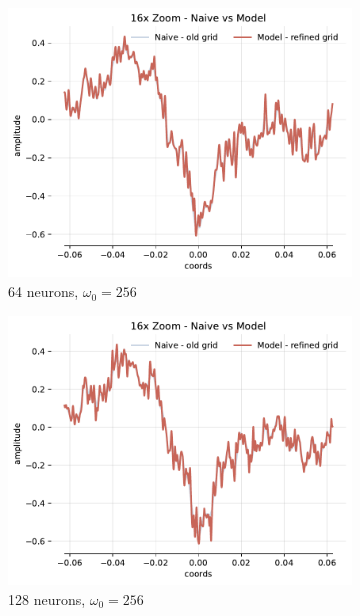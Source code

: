 \begin{figure}[h]
    \begin{subfigure}[b]{0.32\textwidth}
        \centering
        \includegraphics[width=\textwidth]{img/ch3/16x-zoom-1hl-64hf-256hz.pdf}
        \caption{64 neurons, $\omega_0=256$}
        \label{fig:16x-zoom-1hl-64hf-256hz}
    \end{subfigure}
    \begin{subfigure}[b]{0.32\textwidth}
        \centering
        \includegraphics[width=\textwidth]{img/ch3/16x-zoom-1hl-128hf-256hz.pdf}
        \caption{128 neurons, $\omega_0=256$}
        \label{fig:16x-zoom-1hl-128hf-256hz}
    \end{subfigure}
    \begin{subfigure}[b]{0.32\textwidth}

\end{subfigure}
\end{figure}
